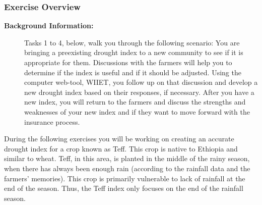 \documentclass[letterpaper,10pt,english]{sphinxmanual}
\begin{document}
\subsubsection{Exercise Overview}
\label{wiiet/wiiet_usingfarmerinformation_Web:exercise-overview}\begin{description}
\item[{\textbf{Background Information:}}] \leavevmode
Tasks 1 to 4, below, walk you through the following scenario: You are bringing a preexisting drought index to a new community to see if it is appropriate for them. Discussions with the farmers will help you to determine if the index is useful and if it should be adjusted. Using the computer web-tool, WIIET, you follow up on that discussion and develop a new drought index based on their responses, if necessary. After you have a new index, you will return to the farmers and discuss the strengths and weaknesses of your new index and if they want to move forward with the insurance process.

\end{description}

During the following exercises you will be working on creating an accurate drought index for a crop known as Teff. This crop is native to Ethiopia and similar to wheat. Teff, in this area, is planted in the middle of the rainy season, when there has always been enough rain (according to the rainfall data and the farmers' memories). This crop is primarily vulnerable to lack of rainfall at the end of the season. Thus, the Teff index only focuses on the end of the rainfall season.
\end{document}
